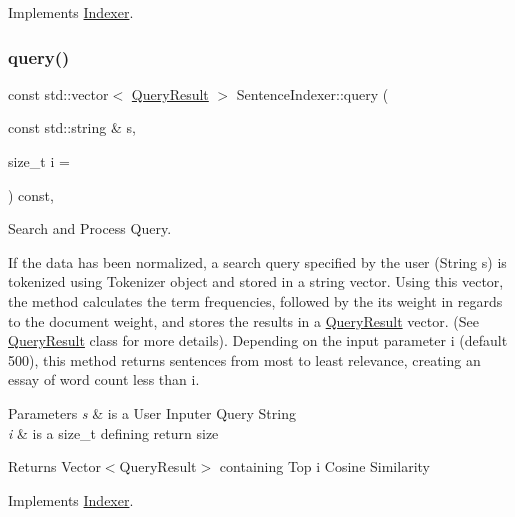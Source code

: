 Implements \hyperlink{class_indexer}{Indexer}.

\mbox{\label{class_sentence_indexer_acc4165c39f2193050d207861936927a7}} 
\subsubsection{\texorpdfstring{query()}{query()}}
{\footnotesize\ttfamily const std\+::vector$<$ \hyperlink{class_query_result}{Query\+Result} $>$ Sentence\+Indexer\+::query (\begin{DoxyParamCaption}\item[{const std\+::string \&}]{s,  }\item[{size\+\_\+t}]{i = {} }\end{DoxyParamCaption}) const\hspace{0.3cm}{\ttfamily [override]}, {\ttfamily [virtual]}}



Search and Process Query. 

If the data has been normalized, a search query specified by the user (String s) is tokenized using Tokenizer object and stored in a string vector. Using this vector, the method calculates the term frequencies, followed by the its weight in regards to the document weight, and stores the results in a \hyperlink{class_query_result}{Query\+Result} vector. (See \hyperlink{class_query_result}{Query\+Result} class for more details). Depending on the input parameter i (default 500), this method returns sentences from most to least relevance, creating an essay of word count less than i.


\begin{DoxyParams}{Parameters}
{\em s} & is a User Inputer Query String \\
\hline
{\em i} & is a size\+\_\+t defining return size \\
\hline
\end{DoxyParams}
\begin{DoxyReturn}{Returns}
Vector$<$\+Query\+Result$>$ containing Top i Cosine Similarity 
\end{DoxyReturn}


Implements \hyperlink{class_indexer_a8d98ba740db6f5f8521d557bf908aead}{Indexer}.

\mbox{\label{class_sentence_indexer_af059ce5526fad2995f5595ace00e51a3}} 
